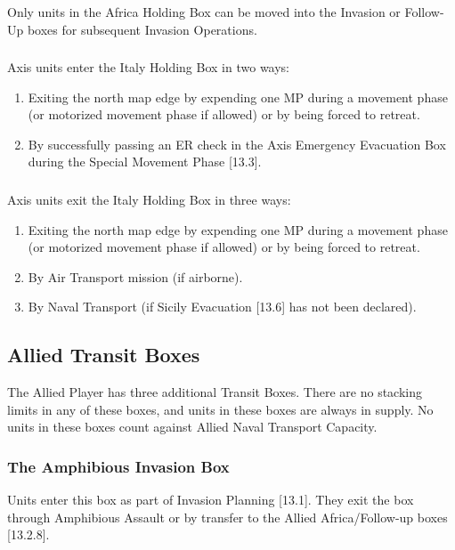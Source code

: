 \subsubsection{}
Only units in the Africa Holding Box can be moved into the Invasion or Follow-Up boxes for subsequent Invasion Operations.

\subsubsection{}
Axis units enter the Italy Holding Box in two ways:

\begin{enumerate}[label=\alph*.]
    \item Exiting the north map edge by expending one MP during a movement phase (or motorized movement phase if allowed) or by being forced to retreat.
    \item By successfully passing an ER check in the Axis Emergency Evacuation Box during the Special Movement Phase [13.3].
\end{enumerate}

\subsubsection{}
Axis units exit the Italy Holding Box in three ways:

\begin{enumerate}[label=\alph*.]
    \item Exiting the north map edge by expending one MP during a movement phase (or motorized movement phase if allowed) or by being forced to retreat.
    \item By Air Transport mission (if airborne).
    \item By Naval Transport (if Sicily Evacuation [13.6] has not been declared).
\end{enumerate}

\subsection{Allied Transit Boxes}
The Allied Player has three additional Transit Boxes. There are no stacking limits in any of these boxes, and units in these boxes are always in supply. No units in these boxes count against Allied Naval Transport Capacity.

\subsubsection{\textbf{The Amphibious Invasion Box}}
Units enter this box as part of Invasion Planning [13.1]. They exit the box through Amphibious Assault or by transfer to the Allied Africa/Follow-up boxes [13.2.8].


